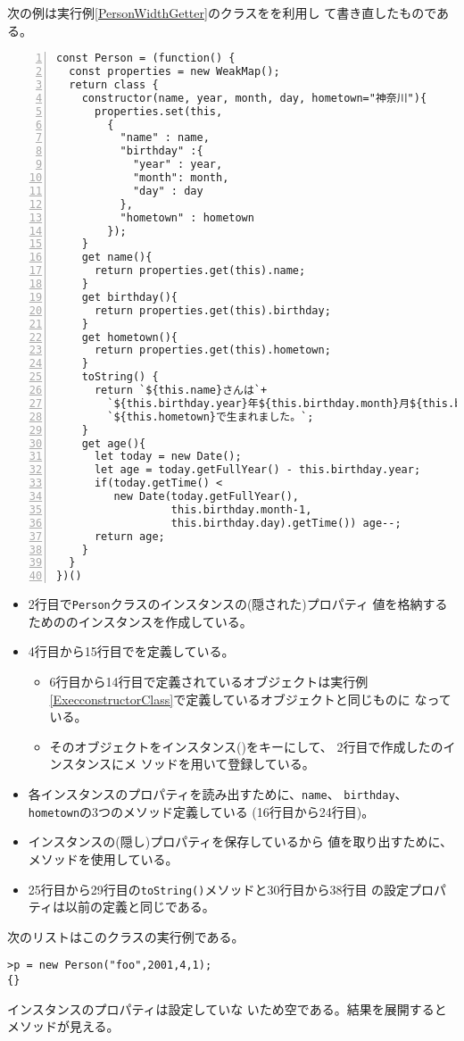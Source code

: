 \begin{Exec}\upshape\label{WeakMap}
  次の例は実行例\ref{PersonWidthGetter}のクラスをを利用し
 て書き直したものである。
\begin{Verbatim}[numbers=left]
const Person = (function() {
  const properties = new WeakMap();
  return class {
    constructor(name, year, month, day, hometown="神奈川"){
      properties.set(this,
        {
          "name" : name,
          "birthday" :{
            "year" : year,
            "month": month,
            "day" : day
          },
          "hometown" : hometown
        });
    }
    get name(){
      return properties.get(this).name;
    }
    get birthday(){
      return properties.get(this).birthday;
    }
    get hometown(){
      return properties.get(this).hometown;
    }
    toString() {
      return `${this.name}さんは`+
        `${this.birthday.year}年${this.birthday.month}月${this.birthday.day}日に` +
        `${this.hometown}で生まれました。`;
    }
    get age(){
      let today = new Date();
      let age = today.getFullYear() - this.birthday.year;
      if(today.getTime() <
         new Date(today.getFullYear(),
                  this.birthday.month-1,
                  this.birthday.day).getTime()) age--;
      return age;
    }
  }
})()
\end{Verbatim}
 \begin{itemize}
  \item 2行目で\texttt{Person}クラスのインスタンスの(隠された)プロパティ
        値を格納するためののインスタンスを作成している。
  \item 4行目から15行目でを定義している。
        \begin{itemize}
         \item 6行目から14行目で定義されているオブジェクトは実行例
        \ref{ExecconstructorClass}で定義しているオブジェクトと同じものに
               なっている。
         \item そのオブジェクトをインスタンス()をキーにして、
               2行目で作成したのインスタンスにメ
               ソッドを用いて登録している。
        \end{itemize}
  \item 各インスタンスのプロパティを読み出すために、\texttt{name}、
        \texttt{birthday}、\texttt{hometown}の3つのメソッド定義している
        (16行目から24行目)。
  \item インスタンスの(隠し)プロパティを保存しているから
        値を取り出すために、メソッドを使用している。
  \item 25行目から29行目の\texttt{toString()}メソッドと30行目から38行目
        の設定プロパティは以前の定義と同じである。
 \end{itemize}
 次のリストはこのクラスの実行例である。
\begin{Verbatim}
>p = new Person("foo",2001,4,1);
{}
\end{Verbatim}
インスタンスのプロパティは設定していな
 いため空である。結果を展開するとメソッドが見える。


\end{Exec}
